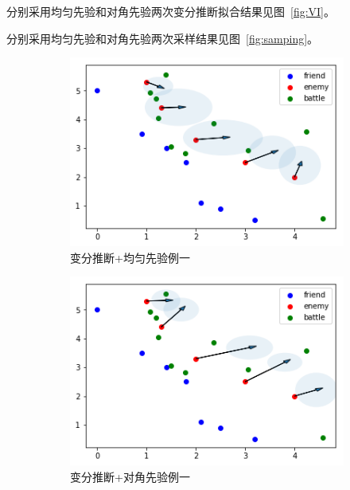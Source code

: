 \documentclass{article}
\begin{document}
分别采用均匀先验和对角先验两次变分推断拟合结果见图~\ref{fig:VI}。

分别采用均匀先验和对角先验两次采样结果见图~\ref{fig:samping}。

\begin{figure}[ht]
  \begin{subfigure}[b]{0.45\linewidth}
    \includegraphics[width=\linewidth]{VI11.png}
    \caption{变分推断+均匀先验例一}
  \end{subfigure}
  \begin{subfigure}[b]{0.45\linewidth}
    \includegraphics[width=\linewidth]{VI12.png}
    \caption{变分推断+对角先验例一}
  \end{subfigure}
  \begin{subfigure}[b]{0.45\linewidth}

\end{subfigure}
\end{figure}
\end{document}
